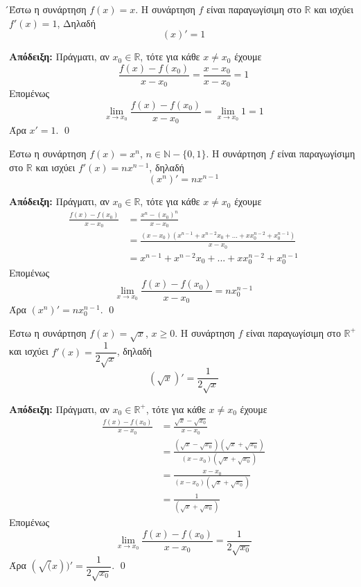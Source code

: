 \documentclass[a4paper, 12pt]{article}
\renewenvironment{proof}[1][\textbf{Απόδειξη}]{%
  \par\noindent\textbf{#1:} \rmfamily}{\qed\par}
\begin{document}
\begin{theorem}{}
  ́Έστω η συνάρτηση $f(x) = x$. Η συνάρτηση $f$ είναι παραγωγίσιμη
  στο $\mathbb{R}$ και ισχύει $f'(x)=1$, Δηλαδή
  $$(x)'=1$$
\end{theorem}
\begin{proof}
  Πράγματι, αν $x_0\in\mathbb{R}$, τότε για κάθε $x\ne x_0$ έχουμε
  $$ \frac{f(x)-f(x_0)}{x-x_0}=\frac{x-x_0}{x-x_0}=1$$
  Επομένως
  $$\lim_{x\to x_0}\frac{f(x)-f(x_0)}{x-x_0}=\lim_{x\to x_0}1=1$$
  Άρα $x'=1$.
\end{proof}

\begin{theorem}{}
  Έστω η  συνάρτηση $f(x)=x^n$, $n\in\mathbb{N}-\{0,1\}$. Η συνάρτηση $f$ είναι παραγωγίσιμη στο $\mathbb{R}$ και ισχύει $f'(x)=nx^{n-1}$, δηλαδή
  $$(x^n)'=nx^{n-1}$$
\end{theorem}
\begin{proof}
  Πράγματι, αν $x_0\in\mathbb{R}$, τότε για κάθε $x\ne x_0$ έχουμε
  \begin{align*}
    \frac{f(x)-f(x_0)}{x-x_0} & =\frac{x^n-(x_0)^n}{x-x_0}                                          \\
                              & =\frac{(x-x_0)(x^{n-1}+x^{n-2}x_0+...+xx_0^{n-2}+x_0^{n-1})}{x-x_0} \\
                              & =x^{n-1}+x^{n-2}x_0+...+xx_0^{n-2}+x_0^{n-1}
  \end{align*}
  Επομένως
  $$\lim_{x\to x_0}\frac{f(x)-f(x_0)}{x-x_0}=nx_0^{n-1}$$
  Άρα $(x^n)'=nx_0^{n-1}$.
\end{proof}

\begin{theorem}{}
  Έστω η συνάρτηση $f(x)=\sqrt{x}$, $x\geq 0$. Η συνάρτηση $f$ είναι παραγωγίσιμη στο $\mathbb{R}^+$ και ισχύει $f'(x)=\dfrac{1}{2\sqrt{x}}$, δηλαδή
  $$(\sqrt{x})'=\frac{1}{2\sqrt{x}}$$
\end{theorem}
\begin{proof}
  Πράγματι, αν $x_0\in\mathbb{R}^+$, τότε για κάθε $x\ne x_0$ έχουμε
  \begin{align*}
    \frac{f(x)-f(x_0)}{x-x_0} & =\frac{\sqrt{x}-\sqrt{x_0}}{x-x_0}                                               \\
                              & =\frac{(\sqrt{x}-\sqrt{x_0})(\sqrt{x}+\sqrt{x_0})}{(x-x_0)(\sqrt{x}+\sqrt{x_0})} \\
                              & =\frac{x-x_0}{(x-x_0)(\sqrt{x}+\sqrt{x_0})}                                      \\
                              & =\frac{1}{(\sqrt{x}+\sqrt{x_0})}
  \end{align*}
  Επομένως
  $$\lim_{x\to x_0}\frac{f(x)-f(x_0)}{x-x_0}=\frac{1}{2\sqrt{x_0}}$$
  Άρα $(\sqrt(x))'=\dfrac{1}{2\sqrt{x_0}}$.
\end{proof}
\end{document}
